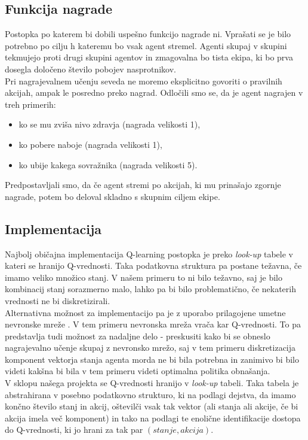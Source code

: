 \documentclass[a4paper,10pt]{article}
\begin{document}
\subsection{Funkcija nagrade}
Postopka po katerem bi dobili uspešno funkcijo nagrade ni. Vprašati se je bilo potrebno po cilju h kateremu bo vsak agent stremel. Agenti skupaj v skupini
tekmujejo proti drugi skupini agentov in zmagovalna bo tista ekipa, ki bo prva dosegla določeno število pobojev nasprotnikov.\\
Pri nagrajevalnem učenju seveda ne moremo eksplicitno govoriti o pravilnih akcijah, ampak le posredno preko nagrad. Odločili smo se, da je agent nagrajen v 
treh primerih:
\begin{itemize}
 \item ko se mu zviša nivo zdravja (nagrada velikosti 1),
 \item ko pobere naboje (nagrada velikosti 1),
 \item ko ubije kakega sovražnika (nagrada velikosti 5).
\end{itemize}
Predpostavljali smo, da če agent stremi po akcijah, ki mu prinašajo zgornje nagrade, potem bo deloval skladno s skupnim ciljem ekipe.

\subsection{Implementacija}
Najbolj običajna implementacija Q-learning postopka je preko \textit{look-up} tabele v kateri se hranijo Q-vrednosti. Taka podatkovna struktura pa 
postane težavna, če imamo veliko množico stanj. V našem primeru to ni bilo težavno, saj je bilo kombinacij stanj sorazmerno malo, lahko pa bi bilo
problematično, če nekaterih vrednosti ne bi diskretizirali.\\
Alternativna možnost za implementacijo pa je z uporabo prilagojene umetne nevronske mreže \cite{ql}. V tem primeru nevronska mreža vrača kar
Q-vrednosti. To pa predstavlja tudi možnost za nadaljne delo - preskusiti kako bi se obneslo nagrajevalno učenje skupaj z nevronsko mrežo, saj
v tem primeru diskretizacija komponent vektorja stanja agenta morda ne bi bila potrebna in zanimivo bi bilo videti kakšna bi bila v tem primeru
videti optimalna politika obnašanja.\\
V sklopu našega projekta se Q-vrednosti hranijo v \textit{look-up} tabeli. Taka tabela je abstrahirana v posebno podatkovno strukturo, ki na podlagi dejstva, 
da imamo končno število stanj in akcij, oštevilči vsak tak vektor (ali stanja ali akcije, če bi akcija imela več komponent) in tako na podlagi te enolične 
identifikacije dostopa do Q-vrednosti, ki jo hrani za tak par $(stanje, akcija)$.
\end{document}
